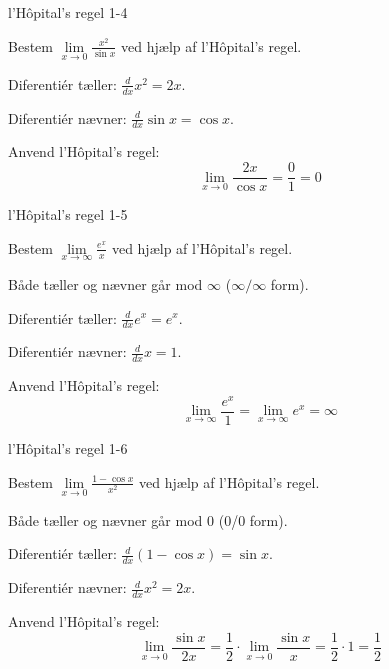 \documentclass{article}
\begin{document}
\newpage

\begin{exercise}{l'Hôpital's regel 1-4}

Bestem $\lim\limits_{x \to 0} \frac{x^2}{\sin x}$ ved hjælp af l'Hôpital's regel.


\hint

Diferentiér tæller: $\frac{d}{dx} x^2 = 2x$.

\hint

Diferentiér nævner: $\frac{d}{dx} \sin x = \cos x$.

\hint

Anvend l'Hôpital's regel:
\[
\lim\limits_{x \to 0} \frac{2x}{\cos x} = \frac{0}{1} = 0
\]

\end{exercise}

\newpage

\begin{exercise}{l'Hôpital's regel 1-5}

Bestem $\lim\limits_{x \to \infty} \frac{e^x}{x}$ ved hjælp af l'Hôpital's regel.

\answerbox{\infty}

\hint

Både tæller og nævner går mod $\infty$ ($\infty/\infty$ form).

\hint

Diferentiér tæller: $\frac{d}{dx} e^x = e^x$.

\hint

Diferentiér nævner: $\frac{d}{dx} x = 1$.

\hint

Anvend l'Hôpital's regel:
\[
\lim\limits_{x \to \infty} \frac{e^x}{1} = \lim\limits_{x \to \infty} e^x = \infty
\]

\end{exercise}

\newpage

\begin{exercise}{l'Hôpital's regel 1-6}

Bestem $\lim\limits_{x \to 0} \frac{1 - \cos x}{x^2}$ ved hjælp af l'Hôpital's regel.


\hint

Både tæller og nævner går mod 0 (0/0 form).

\hint

Diferentiér tæller: $\frac{d}{dx} (1 - \cos x) = \sin x$.

\hint

Diferentiér nævner: $\frac{d}{dx} x^2 = 2x$.

\hint

Anvend l'Hôpital's regel:
\[
\lim\limits_{x \to 0} \frac{\sin x}{2x} = \frac{1}{2} \cdot \lim\limits_{x \to 0} \frac{\sin x}{x} = \frac{1}{2} \cdot 1 = \frac{1}{2}
\]

\end{exercise}
\end{document}
